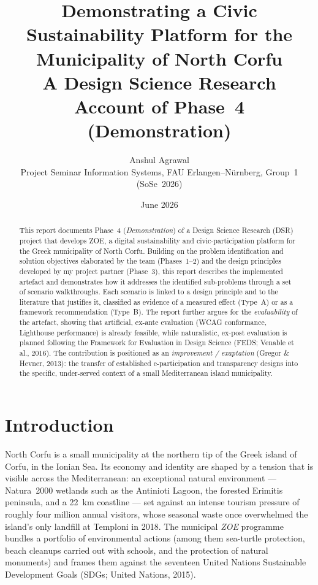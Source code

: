 \documentclass[11pt,a4paper]{article}
\title{\textbf{Demonstrating a Civic Sustainability Platform for the\\ Municipality of North Corfu}\\[0.3em]
\large A Design Science Research Account of Phase~4 (Demonstration)}
\author{Anshul Agrawal\\ \small Project Seminar Information Systems, FAU Erlangen--N\"urnberg, Group~1 (SoSe~2026)}
\date{June 2026}
\begin{document}
\maketitle

\begin{abstract}
\noindent This report documents Phase~4 (\emph{Demonstration}) of a Design Science Research (DSR) project that develops ZOE, a digital sustainability and civic-participation platform for the Greek municipality of North Corfu. Building on the problem identification and solution objectives elaborated by the team (Phases~1--2) and the design principles developed by my project partner (Phase~3), this report describes the implemented artefact and demonstrates how it addresses the identified sub-problems through a set of scenario walkthroughs. Each scenario is linked to a design principle and to the literature that justifies it, classified as evidence of a measured effect (Type~A) or as a framework recommendation (Type~B). The report further argues for the \emph{evaluability} of the artefact, showing that artificial, ex-ante evaluation (WCAG conformance, Lighthouse performance) is already feasible, while naturalistic, ex-post evaluation is planned following the Framework for Evaluation in Design Science (FEDS; Venable et al., 2016). The contribution is positioned as an \emph{improvement / exaptation} (Gregor \& Hevner, 2013): the transfer of established e-participation and transparency designs into the specific, under-served context of a small Mediterranean island municipality.
\end{abstract}

\section{Introduction}

North Corfu is a small municipality at the northern tip of the Greek island of Corfu, in the Ionian Sea. Its economy and identity are shaped by a tension that is visible across the Mediterranean: an exceptional natural environment --- Natura~2000 wetlands such as the Antinioti Lagoon, the forested Erimitis peninsula, and a 22~km coastline --- set against an intense tourism pressure of roughly four million annual visitors, whose seasonal waste once overwhelmed the island's only landfill at Temploni in 2018. The municipal \emph{ZOE} programme bundles a portfolio of environmental actions (among them sea-turtle protection, beach cleanups carried out with schools, and the protection of natural monuments) and frames them against the seventeen United Nations Sustainable Development Goals (SDGs; United Nations, 2015).
\end{document}
